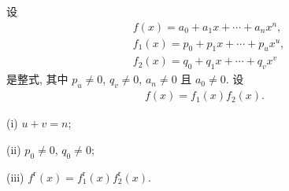 \begin{proposition}
    设
    \begin{align*}
         & f(x) = a_0 + a_1 x + \cdots + a_n x^n,    \\
         & f_1 (x) = p_0 + p_1 x + \cdots + p_u x^u, \\
         & f_2 (x) = q_0 + q_1 x + \cdots + q_v x^v
    \end{align*}
    是整式, 其中 $p_u \neq 0$, $q_v \neq 0$, $a_n \neq 0$ 且 $a_0 \neq 0$. 设
    \begin{align*}
        f(x) = f_1 (x) f_2 (x).
    \end{align*}

    (i) $u + v = n$;

    (ii) $p_0 \neq 0$, $q_0 \neq 0$;

    (iii) $f^{\mathrm{r}} (x) = f_1^{\mathrm{r}} (x) f_2^{\mathrm{r}} (x)$.
\end{proposition}

